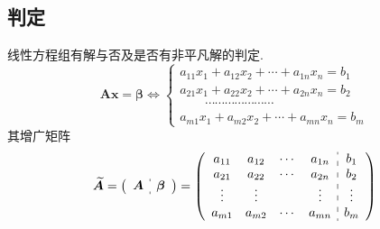\subsection{判定}
\begin{formal}
\begin{theorem}[判定定理]\label{thm:判定定理}
    线性方程组有解与否及是否有非平凡解的判定.
    \[
    \bm{A}\bm{x} = \bm{\beta}
    \Longleftrightarrow 
    \begin{cases*}
        a_{11}x_1+a_{12}x_2+\cdots+a_{1n}x_n = b_1 \\
        a_{21}x_1+a_{22}x_2+\cdots+a_{2n}x_n=b_2\\
        \qquad\cdots\cdots\cdots\cdots\cdots
        \cdots\cdots \\
        a_{m1}x_1+a_{m2}x_2+\cdots+a_{mn}x_n=b_m
    \end{cases*}
    \]
    其增广矩阵
    \[
    \widetilde{\bm{A}}
    =\left (
    \begin{array}{c:c}
        \begin{matrix}
            \bm{A}
        \end{matrix}
        &
        \begin{matrix}
            \bm{\beta}
        \end{matrix}
    \end{array}
    \right )
    =\left (
        \begin{array}{c:c}
            \begin{matrix}
                a_{11} & a_{12} & \cdots & a_{1n} \\
                a_{21} & a_{22} & \cdots & a_{2n} \\
                \vdots & \vdots &  & \vdots \\
                a_{m1} & a_{m2} & \cdots & a_{mn}
            \end{matrix}
            &
            \begin{matrix}
                b_1 \\
                b_2 \\
                \vdots
                \\
                b_m
            \end{matrix}
        \end{array}
    \right )
    \]


\end{theorem}
\end{formal}
